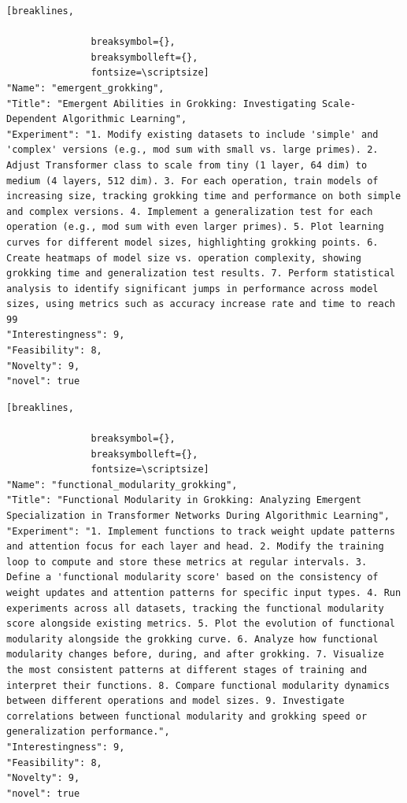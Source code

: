 \begin{tcolorbox}[
  breakable,
  colback  = blue!5!white,
  colframe = blue!75!black,
  title    = {Idea 29/50 - \texttt{emergent\_grokking}},
  fontupper=\scriptsize\ttfamily,
]
\begin{Verbatim}[breaklines,

               breaksymbol={},
               breaksymbolleft={},
               fontsize=\scriptsize]
"Name": "emergent_grokking",
"Title": "Emergent Abilities in Grokking: Investigating Scale-Dependent Algorithmic Learning",
"Experiment": "1. Modify existing datasets to include 'simple' and 'complex' versions (e.g., mod sum with small vs. large primes). 2. Adjust Transformer class to scale from tiny (1 layer, 64 dim) to medium (4 layers, 512 dim). 3. For each operation, train models of increasing size, tracking grokking time and performance on both simple and complex versions. 4. Implement a generalization test for each operation (e.g., mod sum with even larger primes). 5. Plot learning curves for different model sizes, highlighting grokking points. 6. Create heatmaps of model size vs. operation complexity, showing grokking time and generalization test results. 7. Perform statistical analysis to identify significant jumps in performance across model sizes, using metrics such as accuracy increase rate and time to reach 99
"Interestingness": 9,
"Feasibility": 8,
"Novelty": 9,
"novel": true
\end{Verbatim}
\end{tcolorbox}

\begin{tcolorbox}[
  breakable,
  colback  = blue!5!white,
  colframe = blue!75!black,
  title    = {Idea 30/50 - \texttt{functional\_modularity\_grokking}},
  fontupper=\scriptsize\ttfamily,
]
\begin{Verbatim}[breaklines,

               breaksymbol={},
               breaksymbolleft={},
               fontsize=\scriptsize]
"Name": "functional_modularity_grokking",
"Title": "Functional Modularity in Grokking: Analyzing Emergent Specialization in Transformer Networks During Algorithmic Learning",
"Experiment": "1. Implement functions to track weight update patterns and attention focus for each layer and head. 2. Modify the training loop to compute and store these metrics at regular intervals. 3. Define a 'functional modularity score' based on the consistency of weight updates and attention patterns for specific input types. 4. Run experiments across all datasets, tracking the functional modularity score alongside existing metrics. 5. Plot the evolution of functional modularity alongside the grokking curve. 6. Analyze how functional modularity changes before, during, and after grokking. 7. Visualize the most consistent patterns at different stages of training and interpret their functions. 8. Compare functional modularity dynamics between different operations and model sizes. 9. Investigate correlations between functional modularity and grokking speed or generalization performance.",
"Interestingness": 9,
"Feasibility": 8,
"Novelty": 9,
"novel": true
\end{Verbatim}
\end{tcolorbox}

